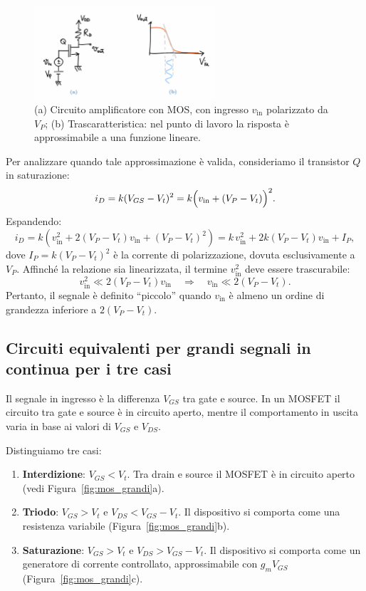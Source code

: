 \begin{figure}[H]
    \centering
    \includegraphics[width=0.6\textwidth]{images/1.1.2.2.png}
    \caption{(a) Circuito amplificatore con MOS, con ingresso \(v_{\text{in}}\) polarizzato da \(V_P\); (b) Trascaratteristica: nel punto di lavoro la risposta è approssimabile a una funzione lineare.}
    \label{fig:mos_equivalente_transf}
\end{figure}

Per analizzare quando tale approssimazione è valida, consideriamo il transistor \(Q\) in saturazione:
\[
i_D = k (V_{GS} - V_t)^2 = k \Bigl(v_{\text{in}} + (V_P - V_t)\Bigr)^2.
\]
Espandendo:
\[
i_D = k \left(v_{\text{in}}^2 + 2(V_P - V_t)v_{\text{in}} + (V_P - V_t)^2\right)
= k\, v_{\text{in}}^2 + 2k(V_P - V_t)v_{\text{in}} + I_P,
\]
dove \(I_P = k (V_P - V_t)^2\) è la corrente di polarizzazione, dovuta esclusivamente a \(V_P\). Affinché la relazione sia linearizzata, il termine \(v_{\text{in}}^2\) deve essere trascurabile:
\[
v_{\text{in}}^2 \ll 2(V_P - V_t)v_{\text{in}} \quad \Longrightarrow \quad v_{\text{in}} \ll 2(V_P - V_t).
\]
Pertanto, il segnale è definito “piccolo” quando \(v_{\text{in}}\) è almeno un ordine di grandezza inferiore a \(2(V_P - V_t)\).

\newpage

\subsection{Circuiti equivalenti per grandi segnali in continua per i tre casi}

Il segnale in ingresso è la differenza \(V_{GS}\) tra gate e source. In un MOSFET il circuito tra gate e source è in circuito aperto, mentre il comportamento in uscita varia in base ai valori di \(V_{GS}\) e \(V_{DS}\).

Distinguiamo tre casi:
\begin{enumerate}
    \item \textbf{Interdizione}: \(V_{GS} < V_t\). Tra drain e source il MOSFET è in circuito aperto (vedi Figura~\ref{fig:mos_grandi}a).
    \item \textbf{Triodo}: \(V_{GS} > V_t\) e \(V_{DS} < V_{GS} - V_t\). Il dispositivo si comporta come una resistenza variabile (Figura~\ref{fig:mos_grandi}b).
    \item \textbf{Saturazione}: \(V_{GS} > V_t\) e \(V_{DS} > V_{GS} - V_t\). Il dispositivo si comporta come un generatore di corrente controllato, approssimabile con \(g_m V_{GS}\) (Figura~\ref{fig:mos_grandi}c).
\end{enumerate}

